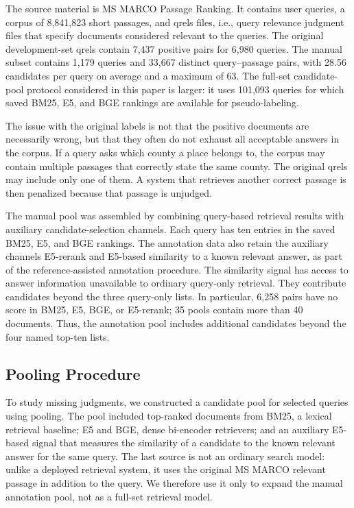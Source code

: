 \documentclass[runningheads,a4paper]{llncs}
\begin{document}
The source material is MS MARCO Passage Ranking. It contains user queries, a corpus of 8,841,823 short passages, and qrels files, i.e., query relevance judgment files that specify documents considered relevant to the queries. The original development-set qrels contain 7,437 positive pairs for 6,980 queries. The manual subset contains 1,179 queries and 33,667 distinct query--passage pairs, with 28.56 candidates per query on average and a maximum of 63. The full-set candidate-pool protocol considered in this paper is larger: it uses 101,093 queries for which saved BM25, E5, and BGE rankings are available for pseudo-labeling.

The issue with the original labels is not that the positive documents are necessarily wrong, but that they often do not exhaust all acceptable answers in the corpus. If a query asks which county a place belongs to, the corpus may contain multiple passages that correctly state the same county. The original qrels may include only one of them. A system that retrieves another correct passage is then penalized because that passage is unjudged.

The manual pool was assembled by combining query-based retrieval results with auxiliary candidate-selection channels. Each query has ten entries in the saved BM25, E5, and BGE rankings. The annotation data also retain the auxiliary channels E5-rerank and E5-based similarity to a known relevant answer, as part of the reference-assisted annotation procedure. The similarity signal has access to answer information unavailable to ordinary query-only retrieval. They contribute candidates beyond the three query-only lists. In particular, 6,258 pairs have no score in BM25, E5, BGE, or E5-rerank; 35 pools contain more than 40 documents. Thus, the annotation pool includes additional candidates beyond the four named top-ten lists.

\subsection{Pooling Procedure}

To study missing judgments, we constructed a candidate pool for selected queries using pooling. The pool included top-ranked documents from BM25, a lexical retrieval baseline; E5 and BGE, dense bi-encoder retrievers; and an auxiliary E5-based signal that measures the similarity of a candidate to the known relevant answer for the same query. The last source is not an ordinary search model: unlike a deployed retrieval system, it uses the original MS MARCO relevant passage in addition to the query. We therefore use it only to expand the manual annotation pool, not as a full-set retrieval model.
\end{document}
